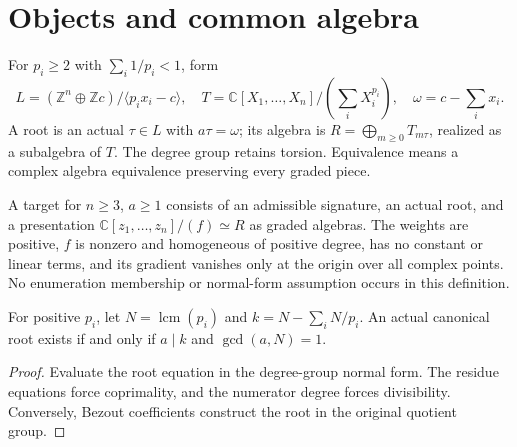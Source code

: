 

\section{Objects and common algebra}

\begin{definition}
\label{def:root}
\leanok
For $p_i\geq2$ with $\sum_i1/p_i<1$, form
\[L=(\mathbb Z^n\oplus\mathbb Zc)/\langle p_ix_i-c\rangle,\quad
T=\mathbb C[X_1,\ldots,X_n]/(\sum_iX_i^{p_i}),\quad\omega=c-\sum_i x_i.\]
A root is an actual $\tau\in L$ with $a\tau=\omega$; its algebra is
$R=\bigoplus_{m\geq0}T_{m\tau}$, realized as a subalgebra of $T$.
The degree group retains torsion. Equivalence means a complex algebra equivalence preserving every graded piece.
\end{definition}

\begin{definition}
\label{def:target}
\leanok
{}
A target for $n\geq3$, $a\geq1$ consists of an admissible signature, an actual root, and a presentation $\mathbb C[z_1,\ldots,z_n]/(f)\simeq R$ as graded algebras. The weights are positive, $f$ is nonzero and homogeneous of positive degree, has no constant or linear terms, and its gradient vanishes only at the origin over all complex points. No enumeration membership or normal-form assumption occurs in this definition.
\end{definition}

\begin{theorem}
\label{thm:root-arithmetic}
\leanok
For positive $p_i$, let $N=\operatorname{lcm}(p_i)$ and $k=N-\sum_iN/p_i$. An actual canonical root exists if and only if $a\mid k$ and $\gcd(a,N)=1$.
\end{theorem}
\begin{proof}
\leanok
{}
Evaluate the root equation in the degree-group normal form. The residue equations force coprimality, and the numerator degree forces divisibility. Conversely, Bezout coefficients construct the root in the original quotient group.
\end{proof}

